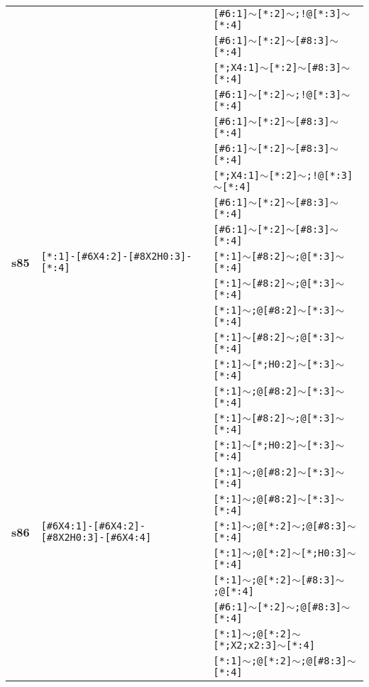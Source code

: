 \begin{longtable}{>{\baselineskip=10pt}p{} >{\baselineskip=10pt}p{} >{\baselineskip=10pt}p{}}
 &  & \texttt{[\#6:1]$\sim$[*:2]$\sim$;!@[*:3]$\sim$[*:4]} \\ 
 &  & \texttt{[\#6:1]$\sim$[*:2]$\sim$[\#8:3]$\sim$[*:4]} \\ 
 &  & \texttt{[*;X4:1]$\sim$[*:2]$\sim$[\#8:3]$\sim$[*:4]} \\ 
 &  & \texttt{[\#6:1]$\sim$[*:2]$\sim$;!@[*:3]$\sim$[*:4]} \\ 
 &  & \texttt{[\#6:1]$\sim$[*:2]$\sim$[\#8:3]$\sim$[*:4]} \\ 
 &  & \texttt{[\#6:1]$\sim$[*:2]$\sim$[\#8:3]$\sim$[*:4]} \\ 
 &  & \texttt{[*;X4:1]$\sim$[*:2]$\sim$;!@[*:3]$\sim$[*:4]} \\ 
 &  & \texttt{[\#6:1]$\sim$[*:2]$\sim$[\#8:3]$\sim$[*:4]} \\ 
 &  & \texttt{[\#6:1]$\sim$[*:2]$\sim$[\#8:3]$\sim$[*:4]} \\ 
\hline 
\textbf{s85} & \texttt{[*:1]-[\#6X4:2]-[\#8X2H0:3]-[*:4]} & \texttt{[*:1]$\sim$[\#8:2]$\sim$;@[*:3]$\sim$[*:4]} \\ 
 &  & \texttt{[*:1]$\sim$[\#8:2]$\sim$;@[*:3]$\sim$[*:4]} \\ 
 &  & \texttt{[*:1]$\sim$;@[\#8:2]$\sim$[*:3]$\sim$[*:4]} \\ 
 &  & \texttt{[*:1]$\sim$[\#8:2]$\sim$;@[*:3]$\sim$[*:4]} \\ 
 &  & \texttt{[*:1]$\sim$[*;H0:2]$\sim$[*:3]$\sim$[*:4]} \\ 
 &  & \texttt{[*:1]$\sim$;@[\#8:2]$\sim$[*:3]$\sim$[*:4]} \\ 
 &  & \texttt{[*:1]$\sim$[\#8:2]$\sim$;@[*:3]$\sim$[*:4]} \\ 
 &  & \texttt{[*:1]$\sim$[*;H0:2]$\sim$[*:3]$\sim$[*:4]} \\ 
 &  & \texttt{[*:1]$\sim$;@[\#8:2]$\sim$[*:3]$\sim$[*:4]} \\ 
 &  & \texttt{[*:1]$\sim$;@[\#8:2]$\sim$[*:3]$\sim$[*:4]} \\ 
\hline 
\textbf{s86} & \texttt{[\#6X4:1]-[\#6X4:2]-[\#8X2H0:3]-[\#6X4:4]} & \texttt{[*:1]$\sim$;@[*:2]$\sim$;@[\#8:3]$\sim$[*:4]} \\ 
 &  & \texttt{[*:1]$\sim$;@[*:2]$\sim$[*;H0:3]$\sim$[*:4]} \\ 
 &  & \texttt{[*:1]$\sim$;@[*:2]$\sim$[\#8:3]$\sim$;@[*:4]} \\ 
 &  & \texttt{[\#6:1]$\sim$[*:2]$\sim$;@[\#8:3]$\sim$[*:4]} \\ 
 &  & \texttt{[*:1]$\sim$;@[*:2]$\sim$[*;X2;x2:3]$\sim$[*:4]} \\ 
 &  & \texttt{[*:1]$\sim$;@[*:2]$\sim$;@[\#8:3]$\sim$[*:4]} \\ 

\end{longtable}
